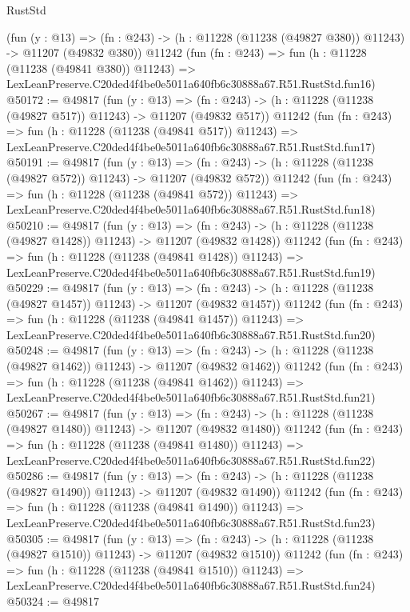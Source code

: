 \begin{lexlean}{RustStd}
\begin{coremodule}
    (fun (y : @13) =>
    (fn : @243) -> (h : @11228 (@11238 (@49827 @380)) @11243) -> @11207 (@49832 @380))
    @11242
    (fun (fn : @243) =>
    fun (h : @11228 (@11238 (@49841 @380)) @11243) =>
    LexLeanPreserve.C20ded4f4be0e5011a640fb6c30888a67.R51.RustStd.fun16)
@50172 := @49817
    (fun (y : @13) =>
    (fn : @243) -> (h : @11228 (@11238 (@49827 @517)) @11243) -> @11207 (@49832 @517))
    @11242
    (fun (fn : @243) =>
    fun (h : @11228 (@11238 (@49841 @517)) @11243) =>
    LexLeanPreserve.C20ded4f4be0e5011a640fb6c30888a67.R51.RustStd.fun17)
@50191 := @49817
    (fun (y : @13) =>
    (fn : @243) -> (h : @11228 (@11238 (@49827 @572)) @11243) -> @11207 (@49832 @572))
    @11242
    (fun (fn : @243) =>
    fun (h : @11228 (@11238 (@49841 @572)) @11243) =>
    LexLeanPreserve.C20ded4f4be0e5011a640fb6c30888a67.R51.RustStd.fun18)
@50210 := @49817
    (fun (y : @13) =>
    (fn : @243) -> (h : @11228 (@11238 (@49827 @1428)) @11243) -> @11207 (@49832 @1428))
    @11242
    (fun (fn : @243) =>
    fun (h : @11228 (@11238 (@49841 @1428)) @11243) =>
    LexLeanPreserve.C20ded4f4be0e5011a640fb6c30888a67.R51.RustStd.fun19)
@50229 := @49817
    (fun (y : @13) =>
    (fn : @243) -> (h : @11228 (@11238 (@49827 @1457)) @11243) -> @11207 (@49832 @1457))
    @11242
    (fun (fn : @243) =>
    fun (h : @11228 (@11238 (@49841 @1457)) @11243) =>
    LexLeanPreserve.C20ded4f4be0e5011a640fb6c30888a67.R51.RustStd.fun20)
@50248 := @49817
    (fun (y : @13) =>
    (fn : @243) -> (h : @11228 (@11238 (@49827 @1462)) @11243) -> @11207 (@49832 @1462))
    @11242
    (fun (fn : @243) =>
    fun (h : @11228 (@11238 (@49841 @1462)) @11243) =>
    LexLeanPreserve.C20ded4f4be0e5011a640fb6c30888a67.R51.RustStd.fun21)
@50267 := @49817
    (fun (y : @13) =>
    (fn : @243) -> (h : @11228 (@11238 (@49827 @1480)) @11243) -> @11207 (@49832 @1480))
    @11242
    (fun (fn : @243) =>
    fun (h : @11228 (@11238 (@49841 @1480)) @11243) =>
    LexLeanPreserve.C20ded4f4be0e5011a640fb6c30888a67.R51.RustStd.fun22)
@50286 := @49817
    (fun (y : @13) =>
    (fn : @243) -> (h : @11228 (@11238 (@49827 @1490)) @11243) -> @11207 (@49832 @1490))
    @11242
    (fun (fn : @243) =>
    fun (h : @11228 (@11238 (@49841 @1490)) @11243) =>
    LexLeanPreserve.C20ded4f4be0e5011a640fb6c30888a67.R51.RustStd.fun23)
@50305 := @49817
    (fun (y : @13) =>
    (fn : @243) -> (h : @11228 (@11238 (@49827 @1510)) @11243) -> @11207 (@49832 @1510))
    @11242
    (fun (fn : @243) =>
    fun (h : @11228 (@11238 (@49841 @1510)) @11243) =>
    LexLeanPreserve.C20ded4f4be0e5011a640fb6c30888a67.R51.RustStd.fun24)
@50324 := @49817

\end{coremodule}
\end{lexlean}
